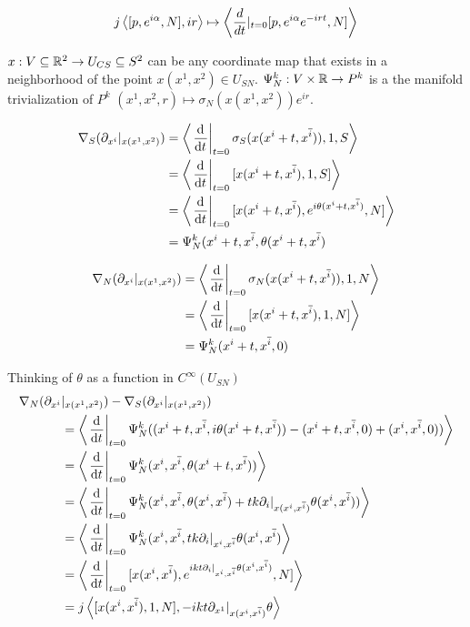 \[j\left\langle [p, e^{i \alpha}, N], ir \right\rangle \mapsto \left\langle \frac{d}{dt}|_{t=0} [p, e^{i\alpha}e^{-irt}, N] \right\rangle\]

$x: V \subseteq \mathbb{R}^2 \to U_{CS} \subseteq S^2$ can be any coordinate map that exists in a neighborhood of the point $x(x^1, x^2) \in U_{SN}$. $\Psi^k_N: V \times \mathbb{R} \to P^k$ is a the manifold trivialization of $P^k$ $(x^1, x^2, r) \mapsto \sigma_N(x(x^1, x^2))e^{ir}$.

\begin{align*}
    \nabla_S(\partial_{x^i}|_{x(x^1, x^2)}) &= \cl{\der{t}[t = 0] \sigma_S(x(x^{i} + t, x^{\overline{i}})), 1, S} \\
        &= \cl{ \der{t}[t = 0] [x(x^{i} + t, x^{\overline{i}}),  1, S] } \\
        &= \cl{ \der{t}[t = 0] [x(x^{i} + t, x^{\overline{i}}),  e^{i \theta(x^{i} + t, x^{\overline{i}})}, N] }\\
        &= \Psi^k_N  (x^{i} + t, x^{\overline{i}},  \theta(x^{i} + t, x^{\overline{i}})
\end{align*}

\begin{align*}
    \nabla_N(\partial_{x^i}|_{x(x^1, x^2)}) &= \cl{\der{t}[t = 0] \sigma_N(x(x^{i} + t, x^{\overline{i}})), 1, N} \\
        &= \cl{ \der{t}[t = 0] [x(x^{i} + t, x^{\overline{i}}),  1, N] }\\
        &= \Psi^k_N  (x^{i} + t, x^{\overline{i}}, 0)
\end{align*}

Thinking of $\theta$ as a function in $C^\infty(U_{SN})$
\begin{align*}
    \nabla_N(\partial_{x^i}&|_{x(x^1, x^2)}) - \nabla_S(\partial_{x^i}|_{x(x^1, x^2)}) \\
    &= \cl{\der{t}[t = 0] \Psi^k_N(  (x^{i} + t, x^{\overline{i}},  i \theta(x^{i} + t, x^{\overline{i}})) - (x^{i} + t, x^{\overline{i}}, 0) + (x^{i}, x^{\overline{i}}, 0) ) } \\
        &= \cl{\der{t}[t = 0] \Psi^k_N(  x^{i}, x^{\overline{i}}, \theta(x^{i} + t, x^{\overline{i}} ))}\\
        &= \cl{\der{t}[t = 0] \Psi^k_N(  x^{i}, x^{\overline{i}},  \theta(x^{i}, x^{\overline{i}}) +  tk \partial_i|_{x(x^{i}, x^{\overline{i}})} \theta(x^{i}, x^{\overline{i}})) }\\
        &= \cl{\der{t}[t = 0] \Psi^k_N(  x^{i}, x^{\overline{i}}, tk \partial_i|_{x^{i}, x^{\overline{i}}} \theta(x^{i}, x^{\overline{i}}) }\\ %
        &= \cl{ \der{t}[t = 0] [x(x^{i}, x^{\overline{i}}), e^{ikt \partial_i|_{x^{i}, x^{\overline{i}}} \theta(x^{i}, x^{\overline{i}})}, N] } \\
        &= j\cl{ [x(x^{i}, x^{\overline{i}}), 1, N], -ikt \partial_{x^1}|_{x(x^{i}, x^{\overline{i}})} \theta }
\end{align*}

